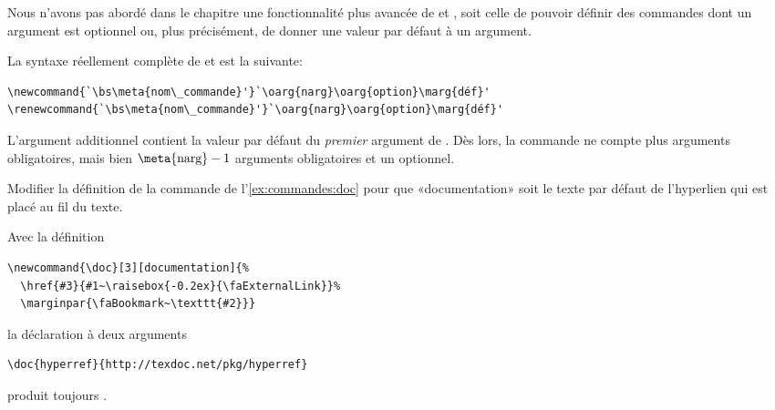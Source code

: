 \begin{exercice}
  Nous n'avons pas abordé dans le chapitre une fonctionnalité plus
  avancée de \cmd{\newcommand} et \cmd{\renewcommand}, soit celle de
  pouvoir définir des commandes dont un argument est optionnel ou,
  plus précisément, de donner une valeur par défaut à un argument.

  La syntaxe réellement complète de \cmd{\newcommand} et
  \cmd{\renewcommand} est la suivante:
\begin{lstlisting}
\newcommand{`\bs\meta{nom\_commande}'}`\oarg{narg}\oarg{option}\marg{déf}'
\renewcommand{`\bs\meta{nom\_commande}'}`\oarg{narg}\oarg{option}\marg{déf}'
\end{lstlisting}
  L'argument additionnel  contient la valeur par défaut
  du \emph{premier} argument de \bs{}. Dès lors, la
  commande ne compte plus  arguments obligatoires, mais
  bien $\text{\meta{narg}} - 1$ arguments obligatoires et un optionnel.

  Modifier la définition de la commande \cmdprint{\doc} de
  l'\autoref{ex:commandes:doc} pour que «documentation» soit le texte
  par défaut de l'hyperlien qui est placé au fil du texte.
  \begin{sol}
    Avec la définition
\begin{lstlisting}
\newcommand{\doc}[3][documentation]{%
  \href{#3}{#1~\raisebox{-0.2ex}{\faExternalLink}}%
  \marginpar{\faBookmark~\texttt{#2}}}
\end{lstlisting}
    la déclaration à deux arguments
\begin{lstlisting}
\doc{hyperref}{http://texdoc.net/pkg/hyperref}
\end{lstlisting}
    produit toujours .
  \end{sol}
\end{exercice}

